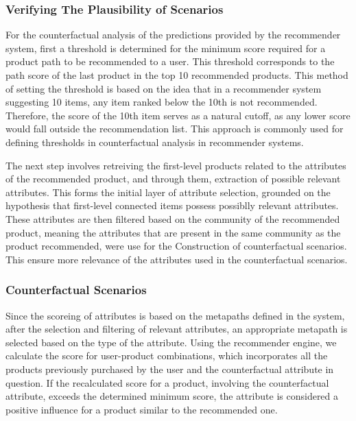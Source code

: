 
\subsubsection{Verifying The Plausibility of Scenarios}
For the counterfactual analysis of the predictions provided by the recommender
system, first a threshold is determined for the minimum score required for a product
path to be recommended to a user. This threshold corresponds to the path score
of the last product in the top 10 recommended products. This method of setting the
threshold is based on the idea that in a recommender system suggesting 10 items,
any item ranked below the 10th is not recommended. Therefore, the score of the
10th item serves as a natural cutoff, as any lower score would fall outside the recommendation
list. This approach is commonly used for defining thresholds in counterfactual
analysis in recommender systems.

The next step involves retreiving the first-level products related to the attributes
of the recommended product, and through them, extraction of possible relevant attributes.
This forms the initial layer of attribute selection, grounded on the hypothesis that
first-level connected items possess possiblly relevant attributes. These attributes 
are then filtered based on the community of the recommended product, meaning the attributes
that are present in the same community as the product recommended, were use for the Construction
of counterfactual scenarios. This ensure more relevance of the attributes used in the 
counterfactual scenarios.

\subsubsection*{Counterfactual Scenarios}
Since the scoreing of attributes is based on the metapaths defined in the system,
after the selection and filtering of relevant attributes, an appropriate metapath is selected
based on the type of the attribute. Using the recommender engine, we calculate
the score for user-product combinations, which incorporates all the products previously
purchased by the user and the counterfactual attribute in question. If the
recalculated score for a product, involving the counterfactual attribute,
exceeds the determined minimum score, the attribute is considered a positive influence
for a product similar to the recommended one.

